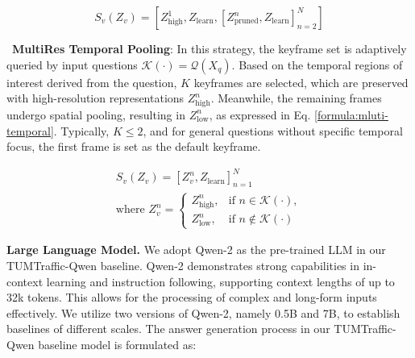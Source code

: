  



{\small
\begin{equation}
S_v(Z_v) = [ Z_{\text{high}}^1, Z_{\text{learn}}, [ Z_{\text{pruned}}^{n}, Z_{\text{learn}} ]_{n=2}^N ]
\label{formula:mluti-spatial_spar}
\end{equation}}



\noindent\textbullet\  \textbf{MultiRes Temporal Pooling}: In this strategy, the keyframe set is adaptively queried by input questions $\mathcal{K}(\cdot)=\mathcal{Q}(X_q)$. Based on the temporal regions of interest derived from the question, $K$ keyframes are selected, which are preserved with high-resolution representations $Z_{\text{high}}^{n}$. Meanwhile, the remaining frames undergo spatial pooling, resulting in $Z_{\text{low}}^{n}$, as expressed in Eq. \ref{formula:mluti-temporal}. Typically, $K \leq 2$, and for general questions without specific temporal focus, the first frame is set as the default keyframe.




{\small
\begin{equation}
\begin{split}
S_v(Z_v) = [ Z_{v}^{n}, Z_{\text{learn}} ]_{n=1}^N  \\
\text{where } Z_v^{n} =
\begin{cases}
Z_{\text{high}}^{n}, & \text{if } n \in \mathcal{K}(\cdot), \\
Z_{\text{low}}^{n}, & \text{if } n \notin \mathcal{K}(\cdot)
\end{cases}
\end{split}
\label{formula:mluti-temporal}
\end{equation}}






\noindent\textbf{Large Language Model.} We adopt Qwen-2 \cite{qwen2} as the pre-trained LLM in our TUMTraffic-Qwen baseline. Qwen-2 demonstrates strong capabilities in in-context learning and instruction following, supporting context lengths of up to 32k tokens. This allows for the processing of complex and long-form inputs effectively. We utilize two versions of Qwen-2, namely 0.5B and 7B, to establish baselines of different scales. The answer generation process in our TUMTraffic-Qwen baseline model is formulated as:

